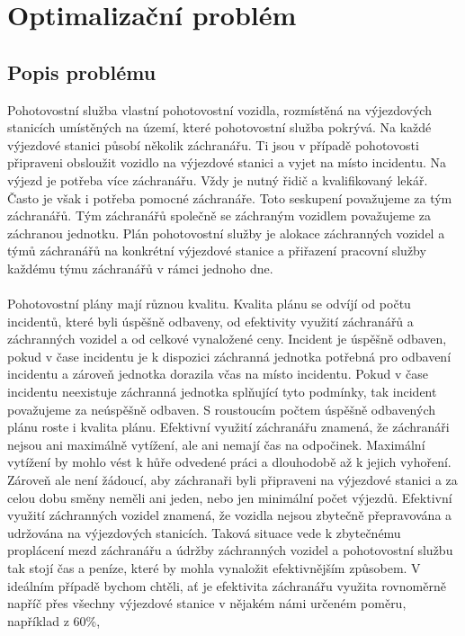 \chapter{Optimalizační problém}

\section{Popis problému}

Pohotovostní služba vlastní pohotovostní vozidla, rozmístěná na výjezdových stanicích umístěných na území, které pohotovostní služba pokrývá.
Na každé výjezdové stanici působí několik záchranářu. Ti jsou v případě pohotovosti připraveni obsloužit vozidlo na výjezdové stanici a vyjet na místo incidentu.
Na výjezd je potřeba více záchranářu. Vždy je nutný řidič a kvalifikovaný lekář. Často je však i potřeba pomocné záchranáře.
Toto seskupení považujeme za tým záchranářů.
Tým záchranářů společně se záchraným vozidlem považujeme za záchranou jednotku.
Plán pohotovostní služby je alokace záchranných vozidel a týmů záchranářů na konkrétní výjezdové stanice a přiřazení pracovní služby každému týmu záchranářů v rámci jednoho dne.
\\\\
Pohotovostní plány mají různou kvalitu. Kvalita plánu se odvíjí od počtu incidentů, které byli úspěšně odbaveny, od efektivity využití záchranářů a záchranných vozidel a od celkové vynaložené ceny.
Incident je úspěšně odbaven, pokud v čase incidentu je k dispozici záchranná jednotka potřebná pro odbavení incidentu a zároveň jednotka dorazila včas na místo incidentu.
Pokud v čase incidentu neexistuje záchranná jednotka splňující tyto podmínky, tak incident považujeme za neúspěšně odbaven.
S roustoucím počtem úspěšně odbavených plánu roste i kvalita plánu.
Efektivní využití záchranářu znamená, že záchranáři nejsou ani maximálně vytížení, ale ani nemají čas na odpočinek.
Maximální vytížení by mohlo vést k hůře odvedené práci a dlouhodobě až k jejich vyhoření.
Zároveň ale není žádoucí, aby záchranaři byli připraveni na výjezdové stanici a za celou dobu směny neměli ani jeden, nebo jen minimální počet výjezdů.
Efektivní využití záchranných vozidel znamená, že vozidla nejsou zbytečně přepravována a udržována na výjezdových stanicích.
Taková situace vede k zbytečnému proplácení mezd záchranářu a údržby záchranných vozidel a pohotovostní službu tak stojí čas a peníze, které by mohla vynaložit efektivnějším způsobem.
V ideálním případě bychom chtěli, ať je efektivita záchranářu využita rovnoměrně napříč přes všechny výjezdové stanice v nějakém námi určeném poměru, například z 60\%,
